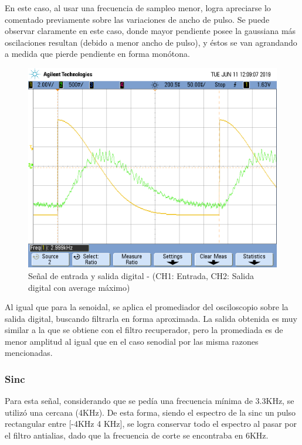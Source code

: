 \documentclass[assd_tp3_main.tex]{subfiles}
\begin{document}
En este caso, al usar una frecuencia de sampleo menor, logra apreciarse lo comentado previamente sobre las variaciones de ancho de pulso. Se puede observar claramente en este caso, donde mayor pendiente posee la gaussiana más oscilaciones resultan (debido a menor ancho de pulso), y éstos se van agrandando a medida que pierde pendiente en forma monótona.

\begin{figure}[!ht]
\begin{centering}
\includegraphics[scale=0.25]{../EJ4/Mediciones/0.5Gauss/s2_4.png}
\par\end{centering}
\caption{Señal de entrada y salida digital - (CH1: Entrada, CH2: Salida digital con average máximo)}
\end{figure}

Al igual que para la senoidal, se aplica el promediador del osciloscopio sobre la salida digital, buscando filtrarla en forma aproximada. La salida obtenida es muy similar a la que se obtiene con el filtro recuperador, pero la promediada es de menor amplitud al igual que en el caso senodial por las misma razones mencionadas.
\newpage

\subsubsection{Sinc}

Para esta señal, considerando que se pedía una frecuencia mínima de 3.3KHz, se utilizó una cercana (4KHz). De esta forma, siendo el espectro de la sinc un pulso rectangular entre [-4KHz 4 KHz], se logra conservar todo el espectro al pasar por el filtro antialias, dado que la frecuencia de corte se encontraba en 6KHz.
\end{document}

